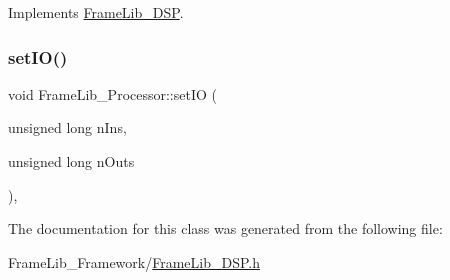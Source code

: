 Implements \hyperlink{class_frame_lib___d_s_p}{Frame\+Lib\+\_\+\+D\+SP}.

\mbox{\label{class_frame_lib___processor_a84035040e5e1cff07e16502ee290881e}} 
\subsubsection{\texorpdfstring{set\+I\+O()}{setIO()}}
{\footnotesize\ttfamily void Frame\+Lib\+\_\+\+Processor\+::set\+IO (\begin{DoxyParamCaption}\item[{unsigned long}]{n\+Ins,  }\item[{unsigned long}]{n\+Outs }\end{DoxyParamCaption})\hspace{0.3cm}{\ttfamily [inline]}, {\ttfamily [protected]}}



The documentation for this class was generated from the following file\+:\begin{DoxyCompactItemize}
\item 
Frame\+Lib\+\_\+\+Framework/\hyperlink{_frame_lib___d_s_p_8h}{Frame\+Lib\+\_\+\+D\+S\+P.\+h}\end{DoxyCompactItemize}

